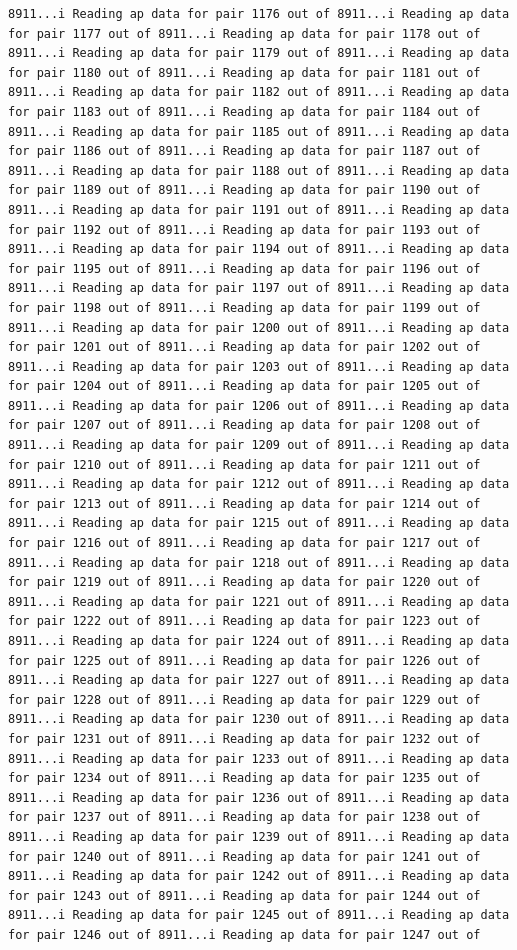 \documentclass[
]{article}
\begin{document}
\begin{verbatim}
8911...i Reading ap data for pair 1176 out of 8911...i Reading ap data for pair 1177 out of 8911...i Reading ap data for pair 1178 out of 8911...i Reading ap data for pair 1179 out of 8911...i Reading ap data for pair 1180 out of 8911...i Reading ap data for pair 1181 out of 8911...i Reading ap data for pair 1182 out of 8911...i Reading ap data for pair 1183 out of 8911...i Reading ap data for pair 1184 out of 8911...i Reading ap data for pair 1185 out of 8911...i Reading ap data for pair 1186 out of 8911...i Reading ap data for pair 1187 out of 8911...i Reading ap data for pair 1188 out of 8911...i Reading ap data for pair 1189 out of 8911...i Reading ap data for pair 1190 out of 8911...i Reading ap data for pair 1191 out of 8911...i Reading ap data for pair 1192 out of 8911...i Reading ap data for pair 1193 out of 8911...i Reading ap data for pair 1194 out of 8911...i Reading ap data for pair 1195 out of 8911...i Reading ap data for pair 1196 out of 8911...i Reading ap data for pair 1197 out of 8911...i Reading ap data for pair 1198 out of 8911...i Reading ap data for pair 1199 out of 8911...i Reading ap data for pair 1200 out of 8911...i Reading ap data for pair 1201 out of 8911...i Reading ap data for pair 1202 out of 8911...i Reading ap data for pair 1203 out of 8911...i Reading ap data for pair 1204 out of 8911...i Reading ap data for pair 1205 out of 8911...i Reading ap data for pair 1206 out of 8911...i Reading ap data for pair 1207 out of 8911...i Reading ap data for pair 1208 out of 8911...i Reading ap data for pair 1209 out of 8911...i Reading ap data for pair 1210 out of 8911...i Reading ap data for pair 1211 out of 8911...i Reading ap data for pair 1212 out of 8911...i Reading ap data for pair 1213 out of 8911...i Reading ap data for pair 1214 out of 8911...i Reading ap data for pair 1215 out of 8911...i Reading ap data for pair 1216 out of 8911...i Reading ap data for pair 1217 out of 8911...i Reading ap data for pair 1218 out of 8911...i Reading ap data for pair 1219 out of 8911...i Reading ap data for pair 1220 out of 8911...i Reading ap data for pair 1221 out of 8911...i Reading ap data for pair 1222 out of 8911...i Reading ap data for pair 1223 out of 8911...i Reading ap data for pair 1224 out of 8911...i Reading ap data for pair 1225 out of 8911...i Reading ap data for pair 1226 out of 8911...i Reading ap data for pair 1227 out of 8911...i Reading ap data for pair 1228 out of 8911...i Reading ap data for pair 1229 out of 8911...i Reading ap data for pair 1230 out of 8911...i Reading ap data for pair 1231 out of 8911...i Reading ap data for pair 1232 out of 8911...i Reading ap data for pair 1233 out of 8911...i Reading ap data for pair 1234 out of 8911...i Reading ap data for pair 1235 out of 8911...i Reading ap data for pair 1236 out of 8911...i Reading ap data for pair 1237 out of 8911...i Reading ap data for pair 1238 out of 8911...i Reading ap data for pair 1239 out of 8911...i Reading ap data for pair 1240 out of 8911...i Reading ap data for pair 1241 out of 8911...i Reading ap data for pair 1242 out of 8911...i Reading ap data for pair 1243 out of 8911...i Reading ap data for pair 1244 out of 8911...i Reading ap data for pair 1245 out of 8911...i Reading ap data for pair 1246 out of 8911...i Reading ap data for pair 1247 out of 
\end{verbatim}
\end{document}
